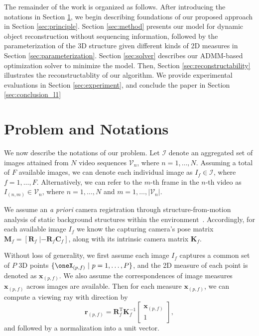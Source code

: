 The remainder of the work is organized as follows.
After introducing the notations in Section \ref{sec:problem_and_notations}, we begin describing foundations of our proposed approach in Section \ref{sec:principle}. Section \ref{sec:method} presents our model for dynamic object reconstruction without sequencing information, followed by the parameterization of the 3D structure given different kinds of 2D measures in Section \ref{sec:parameterization}.
Section \ref{sec:solver} describes our ADMM-based optimization solver to minimize the model. Then, Section \ref{sec:reconstructability} illustrates the reconstructablity of our algorithm. We provide experimental evaluations in Section \ref{sec:experiment}, and conclude the paper in Section \ref{sec:conclusion_l1}


\section{Problem and Notations} \label{sec:problem_and_notations}

We now describe the notations of our problem.
Let $\mathcal I$ denote an aggregated set of images attained from $N$ video sequences $\mathcal V_n $, where $n=1,\dots,N$.
Assuming a total of $F$ available images, we can denote each individual image as $I_f\in \mathcal{I}$, where  $f=1,\dots,F$.
Alternatively, we can refer to  the $m$-th frame in the $n$-th video as $I_{(n,m)} \in \mathcal{V}_n$, where $n=1,\dots,N$ and $m=1,\dots, \left\vert{\mathcal{V}_n }\right\vert$.

We assume an {\em a priori} camera registration  through structure-from-motion analysis of  static background structures within the environment~\cite{WuVSFM}.
Accordingly, for each available image  $I_f$ we know the capturing camera's pose matrix
$\mathbf M_f=\left[  \mathbf{R}_f  \; |-\mathbf{R}_f \mathbf{C}_f\right]$,
along with its intrinsic camera matrix $\mathbf K_f$.

Without loss of generality, we first assume each image $I_f$ captures a common set of $P$ 3D points $\{\oneX_{(p,f)}~|~p=1,\dots,P\}$, and the 2D measure of each point is denoted as $\mathbf{x}_{(p,f)}$.
We also assume the correspondences of image measures $\mathbf{x}_{(p,f)}$ across images are available. 
Then for each measure $\mathbf x_{(p,f)}$, %
we can compute a viewing ray with direction by 
\begin{equation}
\mathbf{r}_{(p,f)}=\mathbf{R}_f^{\text{T}} \mathbf{K}^{-1}_f 
\left[ 
\begin{matrix}   \mathbf{x}_{(p,f)} \\ 1  \end{matrix} 
\right],
\end{equation}
and followed by a normalization into a unit vector.

